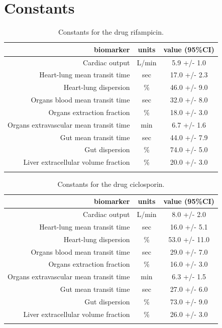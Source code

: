 \documentclass{epflreport}%
\begin{document}
\section{Constants}%
\label{sec:Constants}%

%
\begin{longtable}{rcc}%
\hline%
biomarker&units&value (95\%CI)\\%
\hline%
Cardiac output&L/min&5.9 +/{-} 1.0\\%
Heart{-}lung mean transit time&sec&17.0 +/{-} 2.3\\%
Heart{-}lung dispersion&\%&46.0 +/{-} 9.0\\%
Organs blood mean transit time&sec&32.0 +/{-} 8.0\\%
Organs extraction fraction&\%&18.0 +/{-} 3.0\\%
Organs extravascular mean transit time&min&6.7 +/{-} 1.6\\%
Gut mean transit time&sec&44.0 +/{-} 7.9\\%
Gut dispersion&\%&74.0 +/{-} 5.0\\%
Liver extracellular volume fraction&\%&20.0 +/{-} 3.0\\%
\hline%
\caption{Constants for the drug rifampicin.} \\%
\end{longtable}%
\begin{longtable}{rcc}%
\hline%
biomarker&units&value (95\%CI)\\%
\hline%
Cardiac output&L/min&8.0 +/{-} 2.0\\%
Heart{-}lung mean transit time&sec&16.0 +/{-} 5.1\\%
Heart{-}lung dispersion&\%&53.0 +/{-} 11.0\\%
Organs blood mean transit time&sec&29.0 +/{-} 7.0\\%
Organs extraction fraction&\%&16.0 +/{-} 3.0\\%
Organs extravascular mean transit time&min&6.3 +/{-} 1.5\\%
Gut mean transit time&sec&27.0 +/{-} 6.0\\%
Gut dispersion&\%&73.0 +/{-} 9.0\\%
Liver extracellular volume fraction&\%&26.0 +/{-} 3.0\\%
\hline%
\caption{Constants for the drug ciclosporin.} \\%
\end{longtable}%
\end{document}
